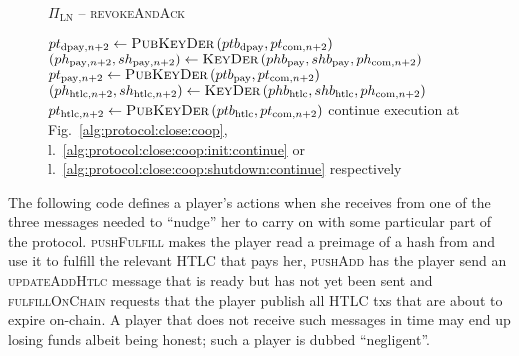 \begin{figure}[H]
\begin{protocolbox}{$\Pi_{\mathrm{LN}}$ -- \textsc{revokeAndAck}}
\begin{algorithmic}[1]
          \State $pt_{\mathrm{dpay}, n+2} \gets
          \textsc{PubKeyDer}\left(ptb_{\mathrm{dpay}}, pt_{\mathrm{com},
          n+2}\right)$
          \State $(ph_{\mathrm{pay}, n+2}, sh_{\mathrm{pay}, n+2}) \gets
          \textsc{KeyDer}\left(phb_{\mathrm{pay}}, shb_{\mathrm{pay}},
          ph_{\mathrm{com}, n+2}\right)$
          \State $pt_{\mathrm{pay}, n+2} \gets
          \textsc{PubKeyDer}\left(ptb_{\mathrm{pay}}, pt_{\mathrm{com},
          n+2}\right)$
          \State $(ph_{\mathrm{htlc}, n+2}, sh_{\mathrm{htlc}, n+2}) \gets
          \textsc{KeyDer}\left(phb_{\mathrm{htlc}}, shb_{\mathrm{htlc}},
          ph_{\mathrm{com}, n+2}\right)$
          \State $pt_{\mathrm{htlc}, n+2} \gets
          \textsc{PubKeyDer}\left(ptb_{\mathrm{htlc}}, pt_{\mathrm{com},
          n+2}\right)$
            \State continue execution at Fig.~\ref{alg:protocol:close:coop},
            l.~\ref{alg:protocol:close:coop:init:continue} or
            l.~\ref{alg:protocol:close:coop:shutdown:continue} respectively
          \EndIf
        \EndIndent
      \end{algorithmic}
    \end{protocolbox}
    \caption{}
    \label{alg:protocol:pay:revokeAndAck}
  \end{figure}

  The following code defines a player's actions when she receives from
  \environment{} one of the three messages needed to ``nudge'' her to carry on
  with some particular part of the protocol. \textsc{pushFulfill} makes the
  player read a preimage of a hash from \ledger{} and use it to fulfill the
  relevant HTLC that pays her, \textsc{pushAdd} has the player send an
  \textsc{updateAddHtlc} message that is ready but has not yet been sent and
  \textsc{fulfillOnChain} requests that the player publish all HTLC txs that are
  about to expire on-chain. A player that does not receive such messages in time
  may end up losing funds albeit being honest; such a player is dubbed
  ``negligent''.

